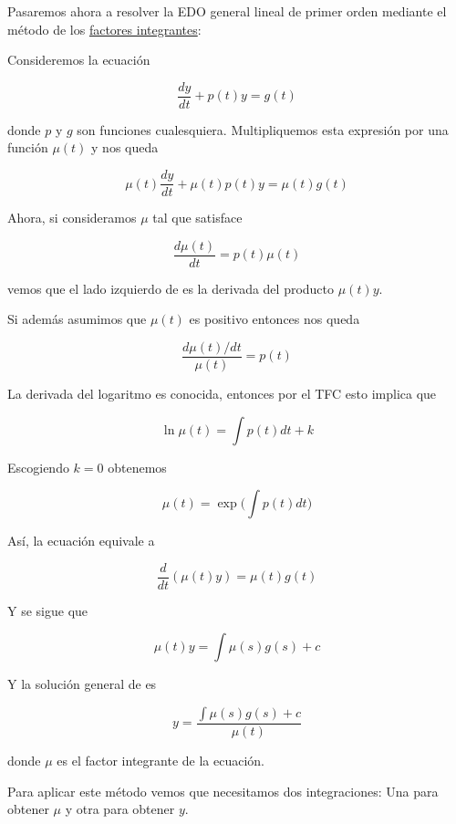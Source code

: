 Pasaremos ahora a resolver la EDO general lineal de primer orden mediante el método de los \ul{factores integrantes}:

Consideremos la ecuación

\begin{equation}\label{eq:met_integrantes1}
    \frac{dy}{dt} + p(t)y = g(t)
\end{equation}

donde $p$ y $g$ son funciones cualesquiera. Multipliquemos esta expresión por una función $\mu(t)$ y nos queda

\begin{equation}\label{eq:met_integrantes2}
    \mu(t)\frac{dy}{dt} + \mu(t)p(t)y = \mu(t)g(t)
\end{equation}

Ahora, si consideramos $\mu$ tal que satisface

\begin{equation}\label{eq:met_integrantes3}
    \frac{d\mu(t)}{dt} = p(t)\mu(t)
\end{equation}

vemos que el lado izquierdo de  es la derivada del producto $\mu(t)y$.

Si además asumimos que $\mu(t)$ es positivo entonces nos queda

\[
    \frac{d\mu(t)/dt}{\mu(t)} = p(t)
\]

La derivada del logaritmo es conocida, entonces por el TFC esto implica que

\[
    \ln\mu(t) = \int p(t)dt + k
\]

Escogiendo $k = 0$ obtenemos

\[
    \mu(t) = \exp \Bigg( \int p(t)dt \Bigg)
\]

Así, la ecuación  equivale a

\[
    \frac{d}{dt}(\mu(t)y) = \mu(t)g(t)
\]

Y se sigue que

\[
    \mu(t)y = \int \mu(s)g(s) + c
\]

Y la solución general de  es

\[
    y = \displaystyle \frac{\int \mu(s)g(s) + c}{\mu(t)}
\]

donde $\mu$ es el factor integrante de la ecuación.

Para aplicar este método vemos que necesitamos dos integraciones: Una para obtener $\mu$ y otra para obtener $y$.